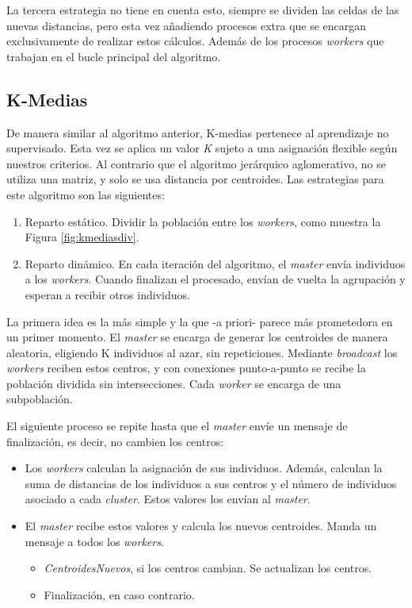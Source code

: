 		La tercera estrategia no tiene en cuenta esto, siempre se dividen las celdas de las nuevas distancias, pero esta vez añadiendo procesos extra que se encargan exclusivamente de realizar estos cálculos. Además de los procesos \textit{workers} que trabajan en el bucle principal del algoritmo.
		
		
	\subsection{K-Medias}
	\label{cap:3_2_2}
		De manera similar al algoritmo anterior, K-medias pertenece al aprendizaje no supervisado. Esta vez se aplica un valor \textit{K} sujeto a una asignación flexible según nuestros criterios. Al contrario que el algoritmo jerárquico aglomerativo, no se utiliza una matriz, y solo se usa distancia por centroides. Las estrategias para este algoritmo son las siguientes:		
		
		
		\begin{enumerate}
			\item Reparto estático. Dividir la población entre los \textit{workers}, como muestra la Figura \ref{fig:kmediasdiv}. 
			\item Reparto dinámico. En cada iteración del algoritmo, el \textit{master} envía individuos a los \textit{workers}. Cuando finalizan el procesado, envían de vuelta la agrupación y esperan a recibir otros individuos. 
		\end{enumerate}
		
		La primera idea es la más simple y la que -a priori- parece más prometedora en un primer momento. El \textit{master} se encarga de generar los centroides de manera aleatoria, eligiendo K individuos al azar, sin repeticiones. Mediante \textit{broadcast} los \textit{workers} reciben estos centros, y con conexiones punto-a-punto se recibe la población dividida sin intersecciones. Cada \textit{worker} se encarga de una subpoblación. 
		
				
		\begin{mdframed}[roundcorner=5pt]
			El siguiente proceso se repite hasta que el \textit{master} envíe un mensaje de finalización, es decir, no cambien los centros:	
			\begin{itemize}
				\setlength\itemsep{0em} 
				\item Los \textit{workers} calculan la asignación de sus individuos. Además, calculan la suma de distancias de los individuos a sus centros y el número de individuos asociado a cada \textit{cluster}. Estos valores los envían al \textit{master}.
				\item El \textit{master} recibe estos valores y calcula los nuevos centroides. Manda un mensaje a todos los \textit{workers}. 
				\begin{itemize}
					\setlength\itemsep{0em} 
					\item \textit{CentroidesNuevos}, si los centros cambian. Se actualizan los centros.
					\item Finalización, en caso contrario.
				\end{itemize}
			\end{itemize}
		\end{mdframed}
		
